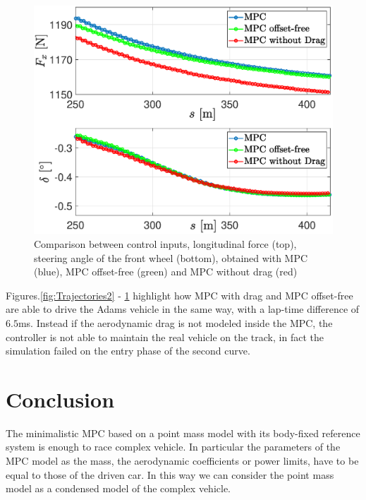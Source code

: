\documentclass[conference]{IEEEtran} %
\begin{document}
\begin{figure}[htb] \centering
	\includegraphics[width=1.\linewidth]{steer_fx}
	\caption{Comparison between control inputs, longitudinal force (top), steering angle of the front wheel (bottom), obtained with MPC (blue), MPC offset-free (green) and MPC without drag (red)}
	\label{fig:steer_fx}
\end{figure}

Figures.\ref{fig:Trajectories2} - \ref{fig:steer_fx} highlight how MPC with drag and MPC offset-free are able to drive the Adams vehicle in the same way, with a lap-time difference of $6.5$ms. Instead if the aerodynamic drag is not modeled inside the MPC, the controller is not able to maintain the real vehicle on the track, in fact the simulation failed on the entry phase of the second curve.



\section{Conclusion}
The minimalistic MPC based on a point mass model with its body-fixed reference system is enough to race complex vehicle. In particular the parameters of the MPC model as the mass, the aerodynamic coefficients or power limits, have to be equal to those of the driven car. In this way we can consider the point mass model as a condensed model of the complex vehicle.
\end{document}
